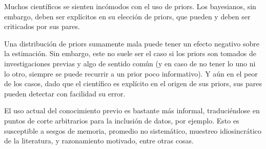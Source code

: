 \documentclass[a4paper,12pt]{article}
\begin{document}
Muchos científicos se sienten incómodos con el uso de priors. Los bayesianos, sin embargo, deben ser explícitos en su elección de priors, que pueden y deben ser criticados por sus pares.

Una distribución de priors sumamente mala puede tener un efecto negativo sobre la estimación. Sin embargo, este no suele ser el caso si los priors son tomados de investigaciones previas y algo de sentido común (y en caso de no tener lo uno ni lo otro, siempre se puede recurrir a un prior poco informativo). Y aún en el peor de los casos, dado que el científico es explícito en el origen de sus priors, sus pares pueden detectar con facilidad su error. 

El uso actual del conocimiento previo es bastante más informal, traduciéndose en puntos de corte arbitrarios para la inclusión de datos, por ejemplo. Esto es susceptible a sesgos de memoria, promedio no sistemático, muestreo idiosincrático de la literatura, y razonamiento motivado, entre otras cosas.
\end{document}
